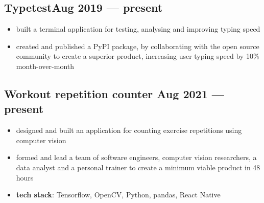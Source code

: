 \documentclass{article}
\begin{document}

\subsection{Typetest\hfill Aug 2019 --- present}
\begin{itemize}
  \itemsep0em
  \item built a terminal application for testing, analysing and improving typing speed
  \item created and published a PyPI package, by collaborating with the open source community to create a superior product, increasing user typing speed by 10\% month-over-month
\end{itemize}

\subsection{Workout repetition counter \hfill Aug 2021 --- present}
\begin{itemize}
  \itemsep0em
  \item designed and built an application for counting exercise repetitions using computer vision
  \item formed and lead a team of software engineers, computer vision researchers, a data analyst and a personal trainer to create a minimum viable product in 48 hours
  \item {\bfseries tech stack}: Tensorflow, OpenCV, Python, pandas, React Native
\end{itemize}

\end{document}
